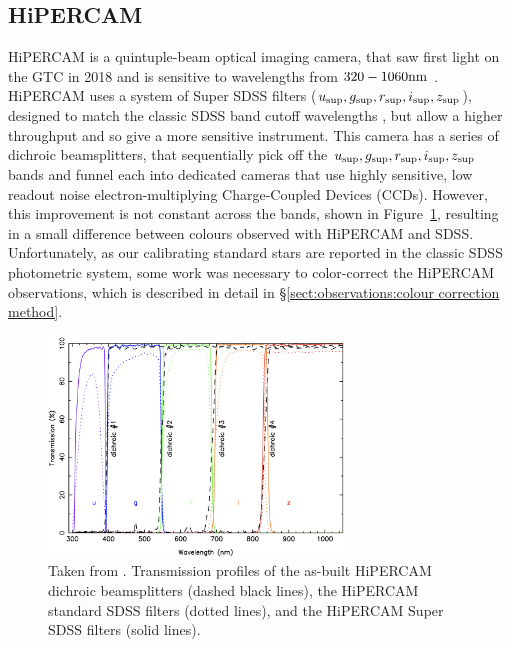 \subsection{HiPERCAM}
\label{sect:observations:hipercam}

HiPERCAM is a quintuple-beam optical imaging camera, that saw first light on the GTC in 2018 and is sensitive to wavelengths from $320 - 1060 \rm nm$ \citep{dhillon2021}. 
HiPERCAM uses a system of Super SDSS filters ($u_{\rm sup}, g_{\rm sup}, r_{\rm sup}, i_{\rm sup}, z_{\rm sup}$), designed to match the classic SDSS band cutoff wavelengths \citep{fukugita1996}, but allow a higher throughput and so give a more sensitive instrument. 
This camera has a series of dichroic beamsplitters, that sequentially pick off the $u_{\rm sup}, g_{\rm sup}, r_{\rm sup}, i_{\rm sup}, z_{\rm sup}$ bands and funnel each into dedicated cameras that use highly sensitive, low readout noise electron-multiplying Charge-Coupled Devices (CCDs). 
However, this improvement is not constant across the bands, shown in Figure~\ref{fig:observations:superSDSS throughput comparison}, resulting in a small difference between colours observed with HiPERCAM and SDSS. 
Unfortunately, as our calibrating standard stars are reported in the classic SDSS photometric system, some work was necessary to color-correct the HiPERCAM observations, which is described in detail in \S\ref{sect:observations:colour correction method}.
\begin{figure}
    \centering
    \includegraphics[width=0.7\textwidth]{figures/observations/plot_dichs_supersdss_asbuilt_v3.png}
    \caption{Taken from \citet{dhillon2021}. Transmission profiles of the as-built HiPERCAM dichroic beamsplitters (dashed black lines), the HiPERCAM standard SDSS filters (dotted lines), and the HiPERCAM Super SDSS filters (solid
    lines).}
    \label{fig:observations:superSDSS throughput comparison}
\end{figure}

